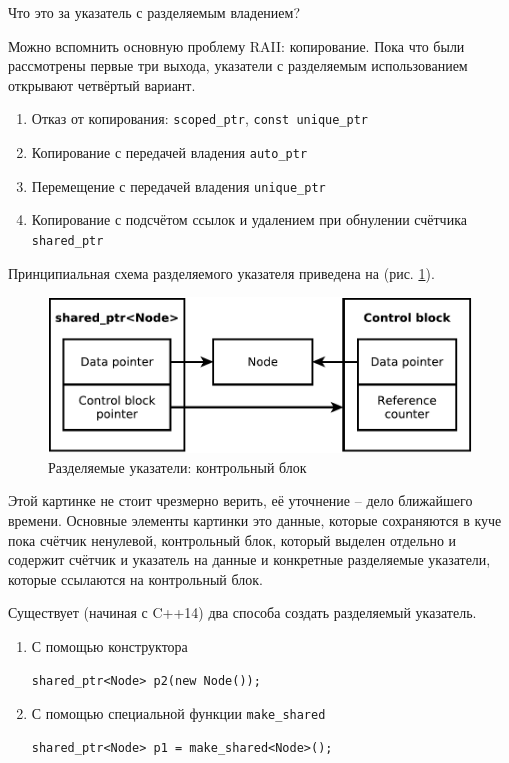 \documentclass[a4paper,12pt,oneside]{article}
\begin{document}
Что это за указатель с разделяемым владением?

Можно вспомнить основную проблему RAII: копирование. Пока что были рассмотрены первые три выхода, указатели с разделяемым использованием открывают четвёртый вариант.

\begin{enumerate}
\item Отказ от копирования: \lstinline!scoped_ptr!, \lstinline!const unique_ptr!
\item Копирование с передачей владения \lstinline!auto_ptr!
\item Перемещение с передачей владения \lstinline!unique_ptr!
\item Копирование с подсчётом ссылок и удалением при обнулении счётчика \lstinline!shared_ptr! 
\end{enumerate}

Принципиальная схема разделяемого указателя приведена на (рис. \ref{fig:smartptrs-outer}).

\begin{figure}[ht]
\centering
\includegraphics[width=1.0\textwidth]{illustrations/smartptrs-outer-crop.pdf}
\caption{Разделяемые указатели: контрольный блок}
\label{fig:smartptrs-outer}
\end{figure}

Этой картинке не стоит чрезмерно верить, её уточнение -- дело ближайшего времени. Основные элементы картинки это данные, которые сохраняются в куче пока счётчик ненулевой, контрольный блок, который выделен отдельно и содержит счётчик и указатель на данные и конкретные разделяемые указатели, которые ссылаются на контрольный блок.

Существует (начиная с C++14) два способа создать разделяемый указатель.

\begin{enumerate}
\item С помощью конструктора 
\begin{lstlisting}
shared_ptr<Node> p2(new Node());
\end{lstlisting}
\item С помощью специальной функции \lstinline!make_shared!
\begin{lstlisting}
shared_ptr<Node> p1 = make_shared<Node>();
\end{lstlisting}
\end{enumerate}
\end{document}
